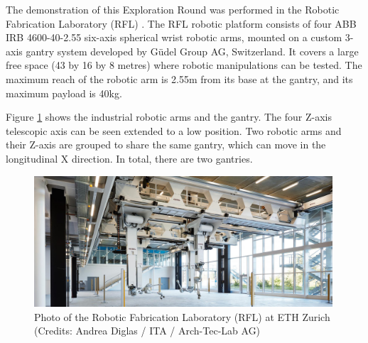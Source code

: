 The demonstration of this Exploration Round was performed in the Robotic Fabrication Laboratory (RFL) . The RFL robotic platform consists of four ABB IRB 4600-40-2.55 six-axis spherical wrist robotic arms, mounted on a custom 3-axis gantry system developed by Güdel Group AG, Switzerland. It covers a large free space (43 by 16 by 8 metres) where robotic manipulations can be tested. The maximum reach of the robotic arm is 2.55m from its base at the gantry, and its maximum payload is 40kg.

Figure \ref{fig:robotic-fabrication-laboratory} shows the industrial robotic arms and the gantry. The four Z-axis telescopic axis can be seen extended to a low position. Two robotic arms and their Z-axis are grouped to share the same gantry, which can move in the longitudinal X direction. In total, there are two gantries.

\begin{figure}
    \centering
    \includegraphics[width=0.99\textwidth]{images/05/image46.png}
    \caption[Photo of the Robotic Fabrication Laboratory (RFL) at ETH Zurich]
    {Photo of the Robotic Fabrication Laboratory (RFL) at ETH Zurich \\
        \footnotesize{(Credits: Andrea Diglas / ITA / Arch-Tec-Lab AG)}}
    \label{fig:robotic-fabrication-laboratory}
\end{figure}

